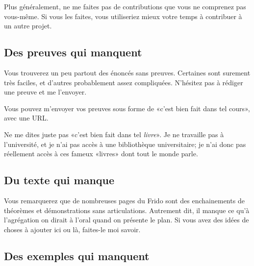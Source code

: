Plus généralement, ne me faites pas de contributions que vous ne comprenez pas vous-même. Si vous les faites, vous utiliseriez mieux votre temps à contribuer à un autre projet.

\subsection{Des preuves qui manquent}
\label{SUBooINTROhowtoContribProofs}

Vous trouverez un peu partout des énoncés sans preuves. Certaines sont surement très faciles, et d'autres probablement assez compliquées. N'hésitez pas à rédiger une preuve et me l'envoyer.

Vous pouvez m'envoyer vos preuves sous forme de «c'est bien fait dans tel cours», avec une URL.

Ne me dites juste pas «c'est bien fait dans tel \emph{livre}». Je ne travaille pas à l'université, et je n'ai pas accès à une bibliothèque universitaire; je n'ai donc pas réellement accès à ces fameux «livres» dont tout le monde parle.

\subsection{Du texte qui manque}
\label{SUBooINTROhowtoContribText}

Vous remarquerez que de nombreuses pages du Frido sont des enchainements de théorèmes et démonstrations sans articulations. Autrement dit, il manque ce qu'à l'agrégation on dirait à l'oral quand on présente le plan. Si vous avez des idées de choses à ajouter ici ou là, faites-le moi savoir.

\subsection{Des exemples qui manquent}
\label{SUBooINTROhowtoContribExamples}

